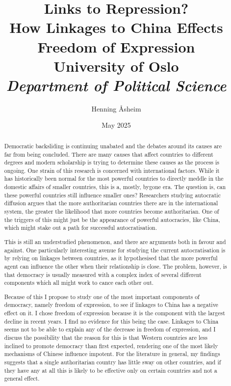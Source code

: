 \documentclass[12pt]{report} %
\title{
    {\textbf{Links to Repression?}}\\
    {\Large How Linkages to China Effects Freedom of Expression} \\
    
    {\large University of Oslo} \\
    {\small\textit{Department of Political Science}} \\
}
\author{Henning Åsheim}
\date{May 2025}
\begin{document}
\maketitle


\begin{abstract}
    Democratic backsliding is continuing unabated and the debates around its causes are far from being concluded. There are many causes that affect countries to different degrees and modern scholarship is trying to determine these causes as the process is ongoing. One strain of this research is concerned with international factors. While it has historically been normal for the most powerful countries to directly meddle in the domestic affairs of smaller countries, this is a, mostly, bygone era. The question is, can these powerful countries still influence smaller ones? Researchers studying autocratic diffusion argues that the more authoritarian countries there are in the international system, the greater the likelihood that more countries become authoritarian. One of the triggers of this might just be the appearance of powerful autocracies, like China, which might stake out a path for successful autocratisation.

    This is still an understudied phenomenon, and there are arguments both in favour and against. One particularly interesting avenue for studying the current autocratisation is by relying on linkages between countries, as it hypothesised that the more powerful agent can influence the other when their relationship is close. The problem, however, is that democracy is usually measured with a complex index of several different components which all might work to cance each other out.

    Because of this I propose to study one of the most important components of democracy, namely freedom of expression, to see if linkages to China has a negative effect on it. I chose freedom of expression because it is the component with the largest decline in recent years. I find no evidence for this being the case. Linkages to China seems not to be able to explain any of the decrease in freedom of expression, and I discuss the possibility that the reason for this is that Western countries are less inclined to promote democracy than first expected, rendering one of the most likely mechanisms of Chinese influence impotent. For the literature in general, my findings suggests that a single authoritarian country has little sway on other countries, and if they have any at all this is likely to be effective only on certain countries and not a general effect.
\end{abstract}
\end{document}

